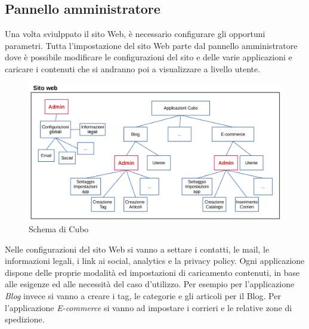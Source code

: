\documentclass[12pt,a4paper]{article}
\begin{document}
\subsection{Pannello amministratore}
Una volta sviulppato il sito Web, è necessario configurare gli opportuni parametri. Tutta l'impostazione del sito Web parte dal pannello amministratore dove è possibile modificare le configurazioni del sito e delle varie applicazioni e caricare i contenuti che si andranno poi a visualizzare a livello utente.
\begin{figure}[H]
    \centering
    \includegraphics[width=1\linewidth]{admin.png}
    \caption{Schema di Cubo}
\end{figure}
Nelle configurazioni del sito Web si vanno a settare i contatti, le mail, le informazioni legali, i link ai social, analytics e la privacy policy.
Ogni applicazione dispone delle proprie modalità ed impostazioni di caricamento contenuti, in base alle esigenze ed alle necessità del caso d'utilizzo. Per esempio per l'applicazione \textit{Blog} invece si vanno a creare i tag, le categorie e gli articoli per il Blog.
Per l'applicazione \textit{E-commerce} si vanno ad impostare i corrieri e le relative zone di spedizione.
\end{document}
